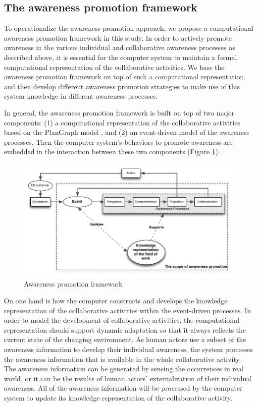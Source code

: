 \subsection{The awareness promotion framework} %
\label{sub:the_awareness_promotion_framework}
To operationalize the awareness promotion approach, we propose a computational awareness promotion framework in this study. In order to actively promote awareness in the various individual and collaborative awareness processes as described above, it is essential for the computer system to maintain a formal computational representation of the collaborative activities. We base the awareness promotion framework on top of such a computational representation, and then develop different awareness promotion strategies to make use of this system knowledge in different awareness processes. 

In general, the awareness promotion framework is built on top of two major components: (1) a computational representation of the collaborative activities based on the PlanGraph model \cite{Cai2003,Cai2005}, and (2) an event-driven model of the awareness processes. Then the computer system’s behaviors to promote awareness are embedded in the interaction between these two components (Figure \ref{fig:awareness_promotion_framework}). 

\begin{figure}[htbp] %
   \centering
   \includegraphics{awareness_promotion_framework.pdf} 
   \caption{Awareness promotion framework}
   \label{fig:awareness_promotion_framework}
\end{figure}

On one hand is how the computer constructs and develops the knowledge representation of the collaborative activities within the event-driven processes. In order to model the development of collaborative activities, the computational representation should support dynamic adaptation so that it always reflects the current state of the changing environment. As human actors use a subset of the awareness information to develop their individual awareness, the system processes the awareness information that is available in the whole collaborative activity. The awareness information can be generated by sensing the occurrences in real world, or it can be the results of human actors' externalization of their individual awareness. All of the awareness information will be processed by the computer system to update its knowledge representation of the collaborative activity.

